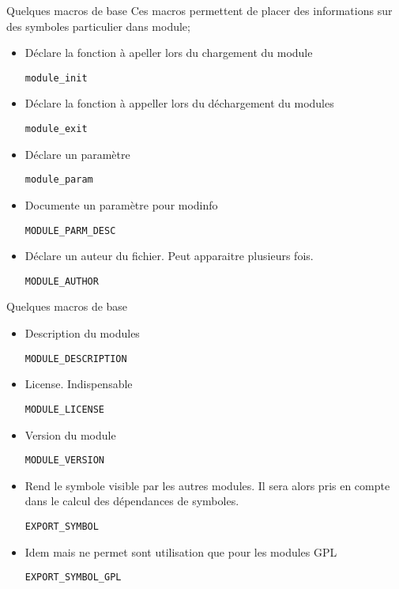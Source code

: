 \begin{frame}[fragile=singleslide]{Quelques macros de base}
  Ces macros  permettent de placer  des informations sur  des symboles
  particulier dans module;
  \begin{itemize} 
  \item Déclare la fonction à apeller lors du chargement du module
    \begin{lstlisting} 
module_init
    \end{lstlisting} 
  \item Déclare la fonction à appeller lors du déchargement du modules
    \begin{lstlisting} 
module_exit
    \end{lstlisting} 
  \item Déclare un paramètre
    \begin{lstlisting}
module_param
    \end{lstlisting}
  \item Documente un paramètre pour modinfo
    \begin{lstlisting}
MODULE_PARM_DESC
    \end{lstlisting}
  \item Déclare un auteur du fichier. Peut apparaitre plusieurs fois.
    \begin{lstlisting}
MODULE_AUTHOR
    \end{lstlisting}
  \end{itemize}
\end{frame}
\begin{frame}[fragile=singleslide]{Quelques macros de base}
  \begin{itemize} 
  \item Description du modules
    \begin{lstlisting}
MODULE_DESCRIPTION
    \end{lstlisting}
  \item License. Indispensable
    \begin{lstlisting}
MODULE_LICENSE
    \end{lstlisting}
  \item Version du module
    \begin{lstlisting}
MODULE_VERSION
    \end{lstlisting}
  \item Rend le symbole visible par les autres modules.  Il sera alors
    pris en compte dans le calcul des dépendances de symboles.
    \begin{lstlisting}
EXPORT_SYMBOL
    \end{lstlisting} 
  \item Idem  mais  ne permet sont utilisation que
    pour les modules GPL
    \begin{lstlisting}
EXPORT_SYMBOL_GPL
    \end{lstlisting} 
  \end{itemize}
\end{frame}

